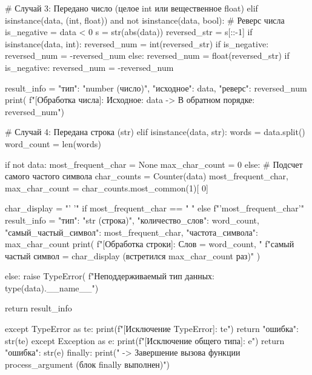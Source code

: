 \documentclass[14pt,a4paper]{extarticle}
\begin{document}
\begin{CodeListing}
        # Случай 3: Передано число (целое int или вещественное float)
        elif isinstance(data, (int, float)) and not isinstance(data, bool):
            # Реверс числа
            is_negative = data < 0
            s = str(abs(data))
            reversed_str = s[::-1]
            if isinstance(data, int):
                reversed_num = int(reversed_str)
                if is_negative:
                    reversed_num = -reversed_num
            else:
                reversed_num = float(reversed_str)
                if is_negative:
                    reversed_num = -reversed_num

            result_info = {
                "тип": "number (число)",
                "исходное": data,
                "реверс": reversed_num
            }
            print(
                f"[Обработка числа]: Исходное: {data} -> В обратном порядке: {reversed_num}")

        # Случай 4: Передана строка (str)
        elif isinstance(data, str):
            words = data.split()
            word_count = len(words)

            if not data:
                most_frequent_char = None
                max_char_count = 0
            else:
                # Подсчет самого частого символа
                char_counts = Counter(data)
                most_frequent_char, max_char_count = char_counts.most_common(1)[
                    0]

            char_display = "' '" if most_frequent_char == " " else f"'{most_frequent_char}'"
            result_info = {
                "тип": "str (строка)",
                "количество_слов": word_count,
                "самый_частый_символ": most_frequent_char,
                "частота_символа": max_char_count
            }
            print(
                f"[Обработка строки]: Слов = {word_count}, "
                f"самый частый символ = {char_display} (встретился {max_char_count} раз)"
            )

        else:
            raise TypeError(
                f"Неподдерживаемый тип данных: {
                    type(data).__name__}")

        return result_info

    except TypeError as te:
        print(f"[Исключение TypeError]: {te}")
        return {"ошибка": str(te)}
    except Exception as e:
        print(f"[Исключение общего типа]: {e}")
        return {"ошибка": str(e)}
    finally:
        print("  -> Завершение вызова функции process_argument (блок finally выполнен)")



\end{CodeListing}
\end{document}
